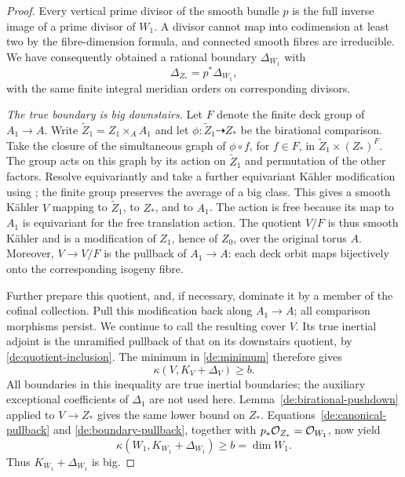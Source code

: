 \begin{proof}
Every vertical prime divisor of the smooth bundle \(p\) is the
full inverse image of a prime divisor of \(W_1\). A divisor cannot
map into codimension at least two by the fibre-dimension formula,
and connected smooth fibres are irreducible. We have consequently
obtained a rational boundary \(\Delta_{W_1}\) with
\begin{equation}\label{de:boundary-pullback}
 \Delta_{Z_*}=p^*\Delta_{W_1},
\end{equation}
with the same finite integral meridian orders on corresponding
divisors.

\medskip\noindent
\emph{The true boundary is big downstairs.}
Let \(F\) denote the finite deck group of \(A_1\to A\).
Write \(\widetilde Z_1=Z_1\times_A A_1\) and let
\(\phi:\widetilde Z_1\dashrightarrow Z_*\) be the birational
comparison. Take the closure of the simultaneous graph of
\(\phi\circ f\), for \(f\in F\), in
\(\widetilde Z_1\times (Z_*)^F\). The group acts on this graph
by its action on \(\widetilde Z_1\) and permutation of the other
factors. Resolve equivariantly and take a further equivariant
K\"ahler modification using
\cite[Theorem~1.1 in the author's version]{JiaMeng2024}; the
finite group preserves the average of a big class. This gives a
smooth K\"ahler \(V\) mapping to \(\widetilde Z_1\), to
\(Z_*\), and to \(A_1\).
The action is free because its map to \(A_1\) is equivariant for
the free translation action. The quotient \(V/F\) is thus smooth
K\"ahler and is a modification of \(Z_1\), hence of \(Z_0\),
over the original torus \(A\). Moreover, \(V\to V/F\) is the
pullback of \(A_1\to A\): each deck orbit maps bijectively onto
the corresponding isogeny fibre.

Further prepare this quotient, and, if necessary, dominate it by
a member of the cofinal collection. Pull this modification back
along \(A_1\to A\); all comparison morphisms persist. We continue
to call the resulting cover \(V\). Its true inertial adjoint is
the unramified pullback of that on its downstairs quotient, by
\eqref{de:quotient-inclusion}. The minimum in
\eqref{de:minimum} therefore gives
\[
 \kappa(V,K_V+\Delta_V)\ge b.
\]
All boundaries in this inequality are true inertial boundaries;
the auxiliary exceptional coefficients of \(\Delta_1\) are not
used here. Lemma~\ref{de:birational-pushdown} applied to
\(V\to Z_*\) gives the same lower bound on \(Z_*\).
Equations~\eqref{de:canonical-pullback} and
\eqref{de:boundary-pullback}, together with \(p_*\mathcal O_{Z_*}=
\mathcal O_{W_1}\), now yield
\[
 \kappa(W_1,K_{W_1}+\Delta_{W_1})\ge b=\dim W_1.
\]
Thus \(K_{W_1}+\Delta_{W_1}\) is big.


\end{proof}
